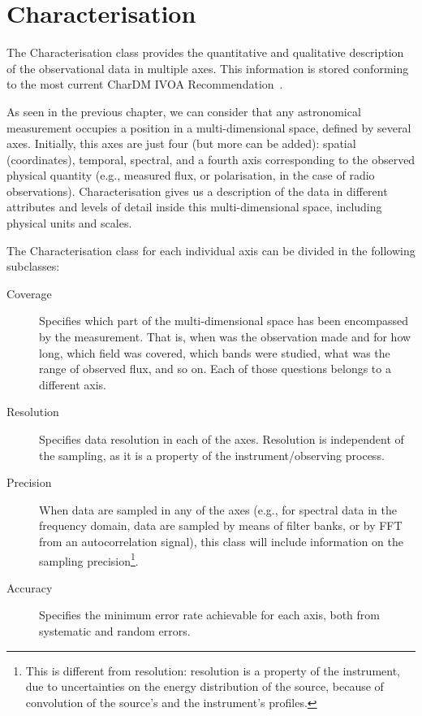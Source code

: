 	
	
	\section{Characterisation} %
		
		The Characterisation class
		provides
		the quantitative and qualitative description of the
		observational data in multiple axes. This information is
		stored conforming to the most current CharDM IVOA
		Recommendation~\cite{2008dmadcrept.....L}.
		
		As seen in the previous chapter, we can consider that any
		astronomical measurement occupies a position in a
		multi-di\-men\-sion\-al space, defined by several axes.
		Initially, this axes are just four (but more can be added):
		spatial (coordinates), temporal, spectral, and a fourth
		axis corresponding to the observed physical quantity (e.g.,
		measured flux, or polarisation, in the case of radio
		observations). Characterisation gives us a description of
		the data in different attributes and levels of detail
		inside this multi-di\-men\-sion\-al space, including
		physical units and scales.
		
		The Characterisation class for each individual axis
		can be divided in the following
		subclasses:
		
		\begin{description}
			\item[Coverage] Specifies which part of the
			multi-di\-men\-sion\-al space has been encompassed by
			the measurement. That is, when was the observation made
			and for how long, which field was covered, which bands
			were studied, what was the range of observed flux, and
			so on. Each of those questions belongs to a different
			axis.
			
			 \item[Resolution] Specifies data resolution in each of
			the axes. Resolution is independent of the sampling, as
			it is a property of the instrument/observing process.
			
			 \item[Precision] When data are sampled in any
			of the axes
			(e.g., for spectral data in the frequency domain, data
			are sampled by means of filter banks, or by FFT from 
			an autocorrelation signal),
			this class will include information on
			the sampling precision\footnote{This is different from
			resolution: resolution is a property of the instrument,
			due to uncertainties on the energy distribution of the
			source, because of convolution of the source’s and the
			instrument’s profiles.}.
			
			\item[Accuracy] Specifies the minimum error rate
			achievable for each axis, both from systematic and
			random errors.
		\end{description}
		
